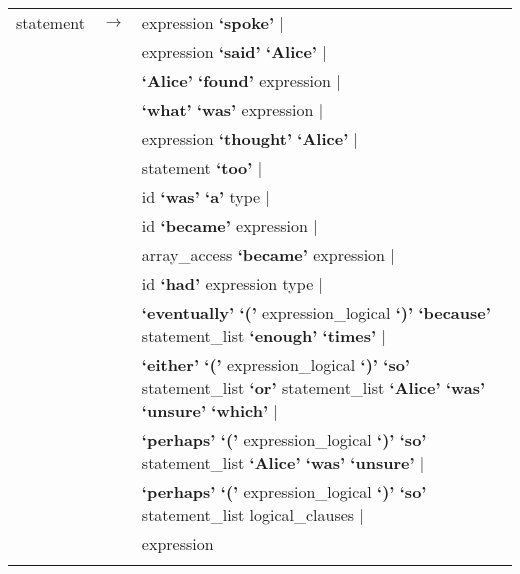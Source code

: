 \documentclass[landscape]{article}
\begin{document}
\begin{longtable}{ l c l}
    statement & \ensuremath{\to} &  expression  \textbf{`spoke'}  | \\
    & &  expression  \textbf{`said'} \textbf{`Alice'}  | \\
    & & \textbf{`Alice'} \textbf{`found'} expression   | \\
    & &  \textbf{`what'} \textbf{`was'} expression   | \\
    & &  expression  \textbf{`thought'} \textbf{`Alice'}  | \\
    & &  statement  \textbf{`too'}  | \\
    & &  id \textbf{`was'} \textbf{`a'} type   | \\
    & &  id \textbf{`became'} expression   | \\
    & &  array\_access  \textbf{`became'} expression   | \\
    & &  id \textbf{`had'} expression  type |\\
    & &  \textbf{`eventually'} \textbf{`('} expression\_logical  \textbf{`)'} \textbf{`because'} statement\_list  \textbf{`enough'} \textbf{`times'}  |\\
    & &  \textbf{`either'} \textbf{`('} expression\_logical  \textbf{`)'} \textbf{`so'} statement\_list  \textbf{`or'} statement\_list  \textbf{`Alice'} \textbf{`was'} \textbf{`unsure'} \textbf{`which'}  | \\
    & &  \textbf{`perhaps'} \textbf{`('} expression\_logical  \textbf{`)'} \textbf{`so'} statement\_list  \textbf{`Alice'} \textbf{`was'} \textbf{`unsure'}  | \\
    & &  \textbf{`perhaps'} \textbf{`('} expression\_logical  \textbf{`)'} \textbf{`so'} statement\_list  logical\_clauses |   \\
    & & expression \\

    \\


\end{longtable}
\end{document}
